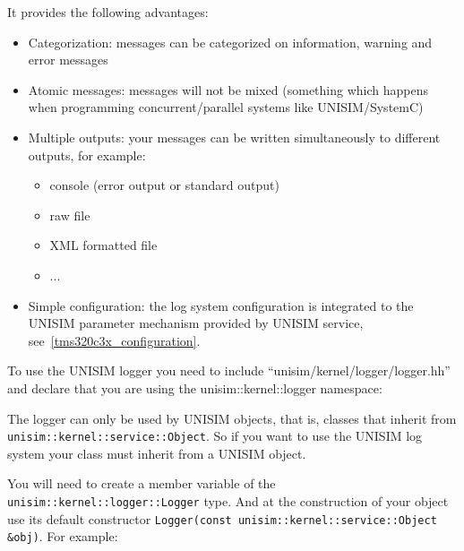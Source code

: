 It provides the following advantages:
\begin{itemize}
\item Categorization: messages can be categorized on information, warning and error messages
\item Atomic messages: messages will not be mixed (something which happens when programming concurrent/parallel systems like UNISIM/SystemC)
\item Multiple outputs: your messages can be written simultaneously to different outputs, for example:
	\begin{itemize}
	\item console (error output or standard output)
	\item raw file
	\item XML formatted file
	\item ...
	\end{itemize}
\item Simple configuration: the log system configuration is integrated to the UNISIM parameter mechanism provided by UNISIM service, see~\ref{tms320c3x_configuration}.
\end{itemize}

To use the UNISIM logger you need to include “unisim/kernel/logger/logger.hh” and declare that you are using the unisim::kernel::logger namespace:

\begin{center}
	
\end{center}

The logger can only be used by UNISIM objects, that is, classes that inherit from \newline
\texttt{unisim::kernel::service::Object}. 
So if you want to use the UNISIM log system your class must inherit from a UNISIM object.

\begin{center}
	
\end{center}

You will need to create a member variable of the \texttt{unisim::kernel::logger::Logger} type. 
And at the construction of your object use its default constructor \newline
\texttt{Logger(const unisim::kernel::service::Object \&obj)}. For example:

\begin{center}
	
\end{center}

